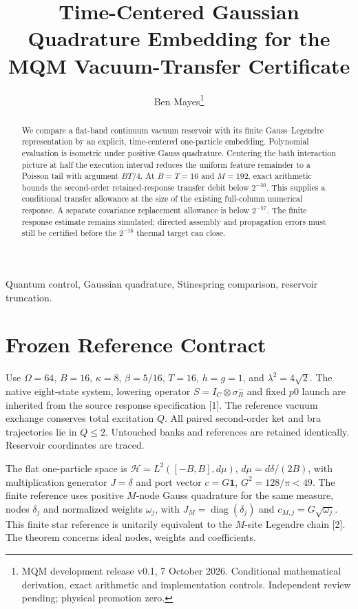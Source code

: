 \documentclass[a4paper,journal]{IEEEtran}
\begin{document}
\title{Time-Centered Gaussian Quadrature Embedding for the MQM Vacuum-Transfer Certificate}
\author{Ben Mayes\thanks{MQM development release v0.1, 7 October 2026. Conditional mathematical derivation, exact arithmetic and implementation controls. Independent review pending; physical promotion zero.}}
\maketitle
\begin{abstract}
We compare a flat-band continuum vacuum reservoir with its finite Gauss--Legendre representation by an explicit, time-centered one-particle embedding. Polynomial evaluation is isometric under positive Gauss quadrature. Centering the bath interaction picture at half the execution interval reduces the uniform feature remainder to a Poisson tail with argument $BT/4$. At $B=T=16$ and $M=192$, exact arithmetic bounds the second-order retained-response transfer debit below $2^{-30}$. This supplies a conditional transfer allowance at the size of the existing full-column numerical response. A separate covariance replacement allowance is below $2^{-57}$. The finite response estimate remains simulated; directed assembly and propagation errors must still be certified before the $2^{-16}$ thermal target can close.
\end{abstract}
\begin{IEEEkeywords}Quantum control, Gaussian quadrature, Stinespring comparison, reservoir truncation.\end{IEEEkeywords}
\section{Frozen Reference Contract}
Use $\Omega=64$, $B=16$, $\kappa=8$, $\beta=5/16$, $T=16$, $h=g=1$, and $\lambda^2=4\sqrt2$. The native eight-state system, lowering operator $S=I_C\otimes\sigma_R^-$ and fixed $p0$ launch are inherited from the source response specification [1]. The reference vacuum exchange conserves total excitation $Q$. All paired second-order ket and bra trajectories lie in $Q\le2$. Untouched banks and references are retained identically. Reservoir coordinates are traced.

The flat one-particle space is $\mathcal H=L^2([-B,B],d\mu)$, $d\mu=d\delta/(2B)$, with multiplication generator $J=\delta$ and port vector $c=G\mathbf1$, $G^2=128/\pi<49$. The finite reference uses positive $M$-node Gauss quadrature for the same measure, nodes $\delta_j$ and normalized weights $\omega_j$, with $J_M=\operatorname{diag}(\delta_j)$ and $c_{M,j}=G\sqrt{\omega_j}$. This finite star reference is unitarily equivalent to the $M$-site Legendre chain [2]. The theorem concerns ideal nodes, weights and coefficients.
\end{document}
